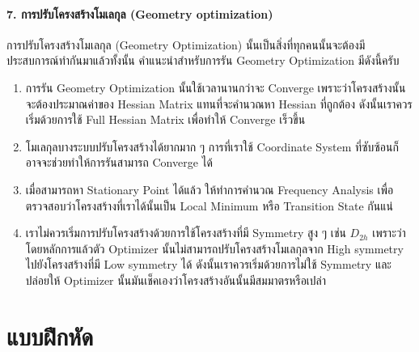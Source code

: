 \paragraph{7. การปรับโครงสร้างโมเลกุล (Geometry optimization)}
การปรับโครงสร้างโมเลกุล (Geometry Optimization) นั้นเป็นสิ่งที่ทุกคนนั้นจะต้องมีประสบการณ์ทำกันมาแล้วทั้งนั้น คำแนะนำสำหรับการรัน
Geometry Optimization มีดังนี้ครับ

\begin{enumerate}
  \item การรัน Geometry Optimization นั้นใช้เวลานานกว่าจะ Converge เพราะว่าโครงสร้างนั้นจะต้องประมาณค่าของ Hessian
        Matrix แทนที่จะคำนวณหา Hessian ที่ถูกต้อง ดังนั้นเราควรเริ่มด้วยการใช้ Full Hessian Matrix เพื่อทำให้ Converge เร็วขึ้น

  \item โมเลกุลบางระบบปรับโครงสร้างได้ยากมาก ๆ การที่เราใช้ Coordinate System ที่ซับซ้อนก็อาจจะช่วยทำให้การรันสามารถ Converge ได้

  \item เมื่อสามารถหา Stationary Point ได้แล้ว ให้ทำการคำนวณ Frequency Analysis เพื่อตรวจสอบว่าโครงสร้างที่เราได้นั้นเป็น
        Local Minimum หรือ Transition State กันแน่

  \item เราไม่ควรเริ่มการปรับโครงสร้างด้วยการใช้โครงสร้างที่มี Symmetry สูง ๆ เช่น $D_{2h}$ เพราะว่าโดยหลักการแล้วตัว Optimizer
        นั้นไม่สามารถปรับโครงสร้างโมเลกุลจาก High symmetry ไปยังโครงสร้างที่มี Low symmetry ได้ ดังนั้นเราควรเริ่มด้วยการไม่ใช้ Symmetry
        และปล่อยให้ Optimizer นั้นมันเช็คเองว่าโครงสร้างอันนั้นมีสมมาตรหรือเปล่า
\end{enumerate}

\section{แบบฝึกหัด}
